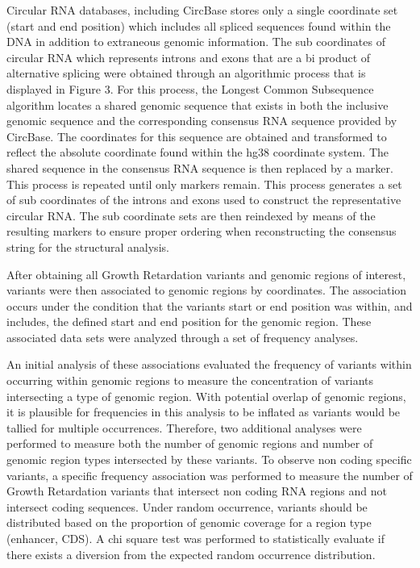 \documentclass[11pt]{article}
\begin{document}
Circular RNA databases, including CircBase stores only a single coordinate set (start and end position) which includes all spliced sequences found within the DNA in addition to extraneous genomic information. The sub coordinates of circular RNA which represents introns and exons that are a bi product of alternative splicing were obtained through an algorithmic process that is displayed in Figure 3. For this process, the Longest Common Subsequence algorithm locates a shared genomic sequence that exists in both the inclusive genomic sequence and the corresponding consensus RNA sequence provided by CircBase. The coordinates for this sequence are obtained and transformed to reflect the absolute coordinate found within the hg38 coordinate system. The shared sequence in the consensus RNA sequence is then replaced by a marker. This process is repeated until only markers remain. This process generates a set of sub coordinates of the introns and exons used to construct the representative circular RNA. The sub coordinate sets are then reindexed by means of the resulting markers to ensure proper ordering when reconstructing the consensus string for the structural analysis. 

After obtaining all Growth Retardation variants and genomic regions of interest, variants were then associated to genomic regions by coordinates. The association occurs under the condition that the variants start or end position was within, and includes, the defined start and end position for the genomic region. These associated data sets were analyzed through a set of frequency analyses. 

An initial analysis of these associations evaluated the frequency of variants within occurring within genomic regions to measure the concentration of variants intersecting a type of genomic region. With potential overlap of genomic regions, it is plausible for frequencies in this analysis to be inflated as variants would be tallied for multiple occurrences. Therefore, two additional analyses were performed to measure both the number of genomic regions and number of genomic region types intersected by these variants. To observe non coding specific variants, a specific frequency association was performed to measure the number of Growth Retardation variants that intersect non coding RNA regions and not intersect coding sequences. Under random occurrence, variants should be distributed based on the proportion of genomic coverage for a region type (enhancer, CDS). A chi square test was performed to statistically evaluate if there exists a diversion from the expected random occurrence distribution.  
\end{document}
